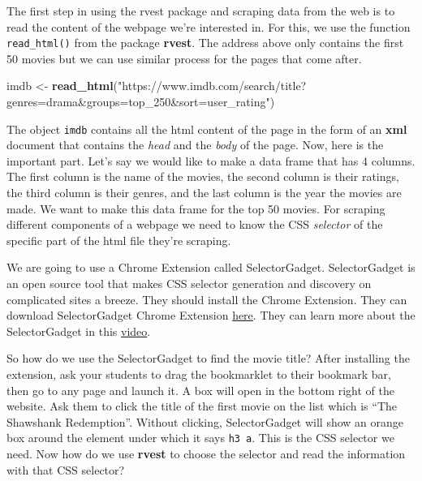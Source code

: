 \documentclass[]{book}
\newenvironment{Shaded}{\begin{snugshade}}{\end{snugshade}}
\newcommand{\KeywordTok}[1]{\textcolor[rgb]{0.13,0.29,0.53}{\textbf{#1}}}
\newcommand{\NormalTok}[1]{#1}
\newcommand{\StringTok}[1]{\textcolor[rgb]{0.31,0.60,0.02}{#1}}
\begin{document}
The first step in using the rvest package and scraping data from the web is to read the content of the webpage we're interested in. For this, we use the function \texttt{read\_html()} from the package \textbf{rvest}. The address above only contains the first 50 movies but we can use similar process for the pages that come after.

\begin{Shaded}
\begin{Highlighting}[]
\NormalTok{imdb <-}\StringTok{ }\KeywordTok{read_html}\NormalTok{(}\StringTok{"https://www.imdb.com/search/title?genres=drama&groups=top_250&sort=user_rating"}\NormalTok{)}
\end{Highlighting}
\end{Shaded}

The object \texttt{imdb} contains all the html content of the page in the form of an \textbf{xml} document that contains the \emph{head} and the \emph{body} of the page. Now, here is the important part. Let's say we would like to make a data frame that has 4 columns. The first column is the name of the movies, the second column is their ratings, the third column is their genres, and the last column is the year the movies are made. We want to make this data frame for the top 50 movies. For scraping different components of a webpage we need to know the CSS \emph{selector} of the specific part of the html file they're scraping.

We are going to use a Chrome Extension called SelectorGadget. SelectorGadget is an open source tool that makes CSS selector generation and discovery on complicated sites a breeze. They should install the Chrome Extension. They can download SelectorGadget Chrome Extension \href{https://chrome.google.com/webstore/detail/selectorgadget/mhjhnkcfbdhnjickkkdbjoemdmbfginb?hl=en}{here}. They can learn more about the SelectorGadget in this \href{https://vimeo.com/52055686}{video}.

So how do we use the SelectorGadget to find the movie title? After installing the extension, ask your students to drag the bookmarklet to their bookmark bar, then go to any page and launch it. A box will open in the bottom right of the website. Ask them to click the title of the first movie on the list which is ``The Shawshank Redemption''. Without clicking, SelectorGadget will show an orange box around the element under which it says \texttt{h3\ a}. This is the CSS selector we need. Now how do we use \textbf{rvest} to choose the selector and read the information with that CSS selector?
\end{document}
